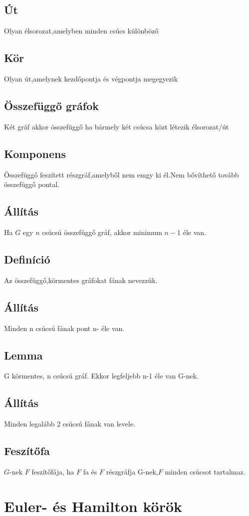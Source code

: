 \documentclass[12pt,a4paper,twoside]{report}
\begin{document}
\subsection{Út}
Olyan élsorozat,amelyben minden csúcs különböző
\subsection{Kör}
Olyan út,amelynek kezdőpontja és végpontja megegyezik
\subsection{Összefüggő gráfok}
Két gráf akkor összefüggő ha bármely két csúcsa közt létezik élsorozat/út
\subsection{Komponens}
Összefüggő feszített részgráf,amelyből nem emgy ki él.Nem bővíthető tovább összefüggő pontal.
\subsection{Állítás}
Ha $G$ egy $n$ csúcsú összefüggő gráf, akkor minimum $n-1$ éle van.
\subsection{Definíció}
Az összefüggő,körmentes gráfokat fának nevezzük.
\subsection{Állítás}
Minden n csúcsú fának pont n- éle van.
\subsection{Lemma}
G körmentes, n csúcsú gráf. Ekkor legfeljebb n-1 éle van G-nek.
\subsection{Állítás}
Minden legalább 2 csúcsú fának van levele.
\subsection{Feszítőfa}
$G$-nek $F$ feszítőfája, ha $F$ fa és $F$ részgráfja G-nek,$F$ minden csúcsot tartalmaz.
\section{Euler- és Hamilton körök}
\end{document}
